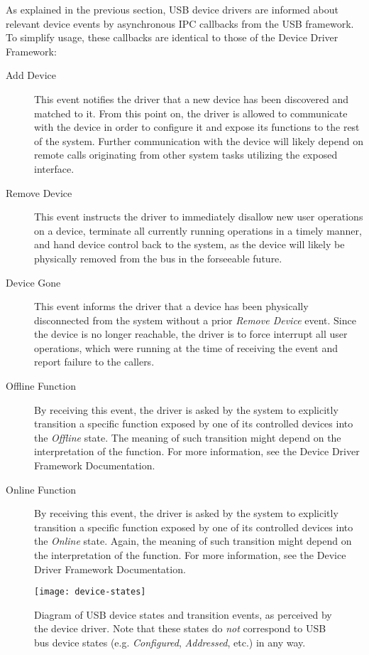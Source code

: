 As explained in the previous section, USB device drivers are informed about
relevant device events by asynchronous IPC callbacks from the USB framework. To
simplify usage, these callbacks are identical to those of the Device Driver
Framework:
~
\begin{description}
	\item[Add Device] This event notifies the driver that a new device has been
	discovered and matched to it. From this point on, the driver is allowed to
	communicate with the device in order to configure it and expose its
	functions to the rest of the system. Further communication with the device
	will likely depend on remote calls originating from other system tasks
	utilizing the exposed interface.

	\item[Remove Device] This event instructs the driver to immediately disallow
	new user operations on a device, terminate all currently running
	operations in a timely manner, and hand device control back to the system,
	as the device will likely be physically removed from the bus in the
	forseeable future.

	\item[Device Gone] This event informs the driver that a device has been
	physically disconnected from the system without a prior \textit{Remove
	Device} event. Since the device is no longer reachable, the driver is to
	force interrupt all user operations, which were running at the time of
	receiving the event and report failure to the callers.
	
	\item[Offline Function] By receiving this event, the driver is asked by the
	system to explicitly transition a specific function exposed by one of its
	controlled devices into the \textit{Offline} state. The meaning of such
	transition might depend on the interpretation of the function. For more
	information, see the Device Driver Framework Documentation.

	\item[Online Function] By receiving this event, the driver is asked by the
	system to explicitly transition a specific function exposed by one of its
	controlled devices into the \textit{Online} state. Again, the meaning of such
	transition might depend on the interpretation of the function. For more
	information, see the Device Driver Framework Documentation.
\end{description}

\begin{figure}
	\centering
	\label{fig:device-states}
	\texttt{[image: device-states]}
	\caption[Diagram of USB device states and transition events.]{Diagram of USB
	device states and transition events, as perceived by the device driver. Note
	that these states do \textit{not} correspond to USB bus device states (e.g.
	\textit{Configured}, \textit{Addressed}, etc.) in any way.}
\end{figure}


